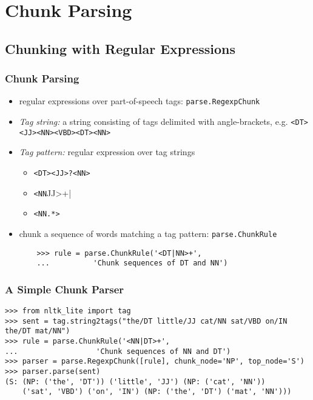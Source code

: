 \documentclass{beamer}             %
\begin{document}
\section{Chunk Parsing}

\subsection{Chunking with Regular Expressions}

\begin{frame}[fragile]
  \frametitle{Chunk Parsing}
  \small

  \begin{itemize}
  \item regular expressions over part-of-speech tags: \texttt{parse.RegexpChunk}
  \item \textit{Tag string:} a string consisting of tags
    delimited with angle-brackets,
    e.g. \verb|<DT><JJ><NN><VBD><DT><NN>|
  \item \textit{Tag pattern:} regular expression over tag strings
    \begin{itemize}
    \item \verb|<DT><JJ>?<NN>|
    \item \verb|<NN|JJ>+|
    \item \verb|<NN.*>|
    \end{itemize}
  \item chunk a sequence of words matching a tag pattern: \texttt{parse.ChunkRule}

\begin{verbatim}
    >>> rule = parse.ChunkRule('<DT|NN>+',
    ...          'Chunk sequences of DT and NN')
\end{verbatim}

  \end{itemize}
\end{frame}


\begin{frame}[fragile]
  \frametitle{A Simple Chunk Parser}
  \scriptsize

\begin{verbatim}
>>> from nltk_lite import tag
>>> sent = tag.string2tags("the/DT little/JJ cat/NN sat/VBD on/IN the/DT mat/NN")
>>> rule = parse.ChunkRule('<NN|DT>+',
...                  'Chunk sequences of NN and DT')
>>> parser = parse.RegexpChunk([rule], chunk_node='NP', top_node='S')
>>> parser.parse(sent)
(S: (NP: ('the', 'DT')) ('little', 'JJ') (NP: ('cat', 'NN'))
    ('sat', 'VBD') ('on', 'IN') (NP: ('the', 'DT') ('mat', 'NN')))
\end{verbatim}
\end{frame}
\end{document}
